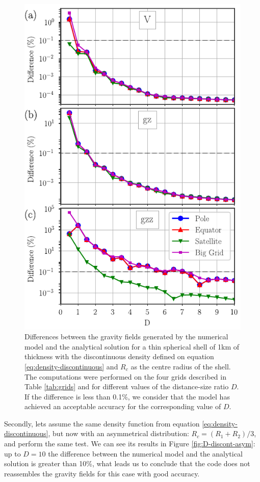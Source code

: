 \documentclass[extra]{gji}
\begin{document}
\begin{figure}
\centering
\includegraphics[width=0.9\linewidth]{figures/Ddiscontinuous-symmetric-differences.pdf}
\caption{
    Differences between the gravity fields generated by the numerical model and the analytical solution for a thin spherical shell of 1km of thickness with the discontinuous density defined on equation \ref{eq:density-discontinuous} and $R_c$ as the centre radius of the shell. The computations were performed on the four grids described in Table \ref{tab:grids} and for different values of the distance-size ratio $D$. If the difference is less than 0.1\%, we consider that the model has achieved an acceptable accuracy for the corresponding value of $D$.
}
\label{fig:D-discont-sym}
\end{figure}

Secondly, lets assume the same density function from equation \ref{eq:density-discontinuous}, but now with an asymmetrical distribution: $R_c = (R_1 + R_2)/3$, and perform the same test.
We can see its results in Figure \ref{fig:D-discont-asym}: up to $D=10$ the difference between the numerical model and the analytical solution is greater than 10\%, what
leads us to conclude that the code does not reassembles the gravity fields for this case with good accuracy.
\end{document}
